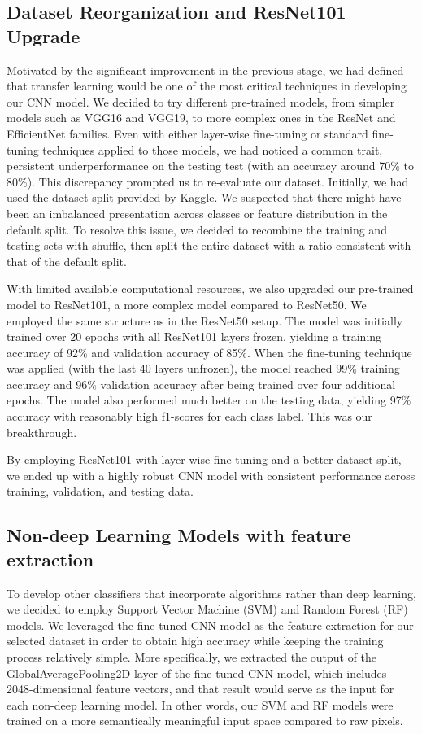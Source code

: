 \documentclass[conference]{IEEEtran}
\begin{document}
\subsection{\large Dataset Reorganization and ResNet101 Upgrade}

Motivated by the significant improvement in the previous stage, we had defined that transfer learning would be one of the most critical techniques in developing our CNN model. We decided to try different pre-trained models, from simpler models such as VGG16 and VGG19, to more complex ones in the ResNet and EfficientNet families. Even with either layer-wise fine-tuning or standard fine-tuning techniques applied to those models, we had noticed a common trait, persistent underperformance on the testing test (with an accuracy around 70\% to 80\%). This discrepancy prompted us to re-evaluate our dataset. Initially, we had used the dataset split provided by Kaggle. We suspected that there might have been an imbalanced presentation across classes or feature distribution in the default split. To resolve this issue, we decided to recombine the training and testing sets with shuffle, then split the entire dataset with a ratio consistent with that of the default split.  

With limited available computational resources, we also upgraded our pre-trained model to ResNet101, a more complex model compared to ResNet50. We employed the same structure as in the ResNet50 setup. The model was initially trained over 20 epochs with all ResNet101 layers frozen, yielding a training accuracy of 92\% and validation accuracy of 85\%. When the fine-tuning technique was applied (with the last 40 layers unfrozen), the model reached 99\% training accuracy and 96\% validation accuracy after being trained over four additional epochs. The model also performed much better on the testing data, yielding 97\% accuracy with reasonably high f1-scores for each class label. This was our breakthrough.

By employing ResNet101 with layer-wise fine-tuning and a better dataset split, we ended up with a highly robust CNN model with consistent performance across training, validation, and testing data.

\subsection{\large Non-deep Learning Models with feature extraction}

To develop other classifiers that incorporate algorithms rather than deep learning, we decided to employ Support Vector Machine (SVM) and Random Forest (RF) models. We leveraged the fine-tuned CNN model as the feature extraction for our selected dataset in order to obtain high accuracy while keeping the training process relatively simple. More specifically, we extracted the output of the GlobalAveragePooling2D layer of the fine-tuned CNN model, which includes 2048-dimensional feature vectors, and that result would serve as the input for each non-deep learning model. In other words, our SVM and RF models were trained on a more semantically meaningful input space compared to raw pixels. 
\end{document}
